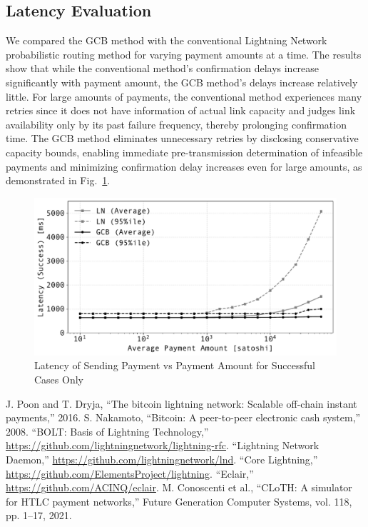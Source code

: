 \documentclass[conference]{IEEEtran}
\begin{document}
\subsection{Latency Evaluation}

We compared the GCB method with the conventional Lightning Network probabilistic routing method for varying payment amounts at a time.
The results show that while the conventional method's confirmation delays increase significantly with payment amount, the GCB method's delays increase relatively little.
For large amounts of payments, the conventional method experiences many retries since it does not have information of actual link capacity and judges link availability only by its past failure frequency, thereby prolonging confirmation time.
The GCB method eliminates unnecessary retries by disclosing conservative capacity bounds, enabling immediate pre-transmission determination of infeasible payments and minimizing confirmation delay increases even for large amounts, as demonstrated in Fig.~\ref{fig:pmt_amt_vs_time}.

\begin{figure}[htbp]
	\centerline{\includegraphics[width=\linewidth]{fig/pmt_amt_vs_time}}
	\caption{Latency of Sending Payment vs Payment Amount for Successful Cases Only}
	\label{fig:pmt_amt_vs_time}
\end{figure}

\begin{thebibliography}{00}
	 J. Poon and T. Dryja, ``The bitcoin lightning network: Scalable off-chain instant payments,'' 2016.
	 S. Nakamoto, ``Bitcoin: A peer-to-peer electronic cash system,'' 2008.
	 ``BOLT: Basis of Lightning Technology,'' \url{https://github.com/lightningnetwork/lightning-rfc}.
	 ``Lightning Network Daemon,'' \url{https://github.com/lightningnetwork/lnd}.
	 ``Core Lightning,'' \url{https://github.com/ElementsProject/lightning}.
	 ``Eclair,'' \url{https://github.com/ACINQ/eclair}.
	 M. Conoscenti et al., ``CLoTH: A simulator for HTLC payment networks,'' Future Generation Computer Systems, vol. 118, pp. 1--17, 2021.
\end{thebibliography}
\end{document}
